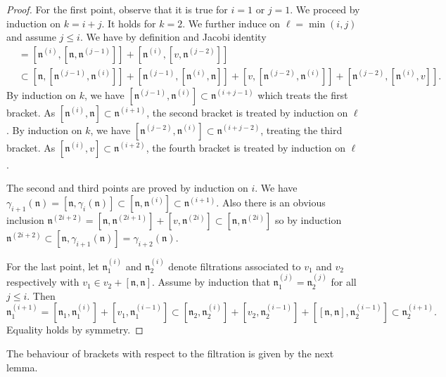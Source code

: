 \documentclass[11pt,leqno]{article}
\theoremstyle{plain}
\theoremstyle{definition}
\theoremstyle{remark}
\numberwithin{equation}{section}
\begin{document}
\begin{proof}
For the first point, observe that it is true for $i=1$ or $j=1$. We proceed by induction on $k=i+j$. It holds for $k=2$. We further induce on $\ell=\min(i,j)$ and assume $j \le i$. We have by definition and Jacobi identity
\begin{align*}
[\mathfrak{n}^{(i)},\mathfrak{n}^{(j)}] & = [\mathfrak{n}^{(i)},[\mathfrak{n},\mathfrak{n}^{(j-1)}]] + [\mathfrak{n}^{(i)},[v,\mathfrak{n}^{(j-2)}]] \\
& \subset [\mathfrak{n},[\mathfrak{n}^{(j-1)},\mathfrak{n}^{(i)}]]+[\mathfrak{n}^{(j-1)},[\mathfrak{n}^{(i)},\mathfrak{n}]]+[v,[\mathfrak{n}^{(j-2)},\mathfrak{n}^{(i)}]]+[\mathfrak{n}^{(j-2)},[\mathfrak{n}^{(i)},v]].
\end{align*}
By induction on $k$, we have $[\mathfrak{n}^{(j-1)},\mathfrak{n}^{(i)}]\subset  \mathfrak{n}^{(i+j-1)}$ which treats the first bracket. As $[\mathfrak{n}^{(i)},\mathfrak{n}]\subset \mathfrak{n}^{(i+1)}$, the second bracket is treated by induction on $\ell$. By induction on $k$, we have $[\mathfrak{n}^{(j-2)},\mathfrak{n}^{(i)}] \subset \mathfrak{n}^{(i+j-2)}$, treating the third bracket. As $[\mathfrak{n}^{(i)},v]\subset \mathfrak{n}^{(i+2)}$, the fourth bracket is treated by induction on $\ell$.

The second and third points are proved by induction on $i$. We have $\gamma_{i+1}(\mathfrak{n})=[\mathfrak{n},\gamma_i(\mathfrak{n})] \subset [\mathfrak{n},\mathfrak{n}^{(i)}] \subset \mathfrak{n}^{(i+1)}$. Also there is an obvious inclusion
$\mathfrak{n}^{(2i+2)}=[\mathfrak{n},\mathfrak{n}^{(2i+1)}]+[v,\mathfrak{n}^{(2i)}]\subset [\mathfrak{n},\mathfrak{n}^{(2i)}]$ so by induction $\mathfrak{n}^{(2i+2)} \subset [\mathfrak{n},\gamma_{i+1}(\mathfrak{n})]=\gamma_{i+2}(\mathfrak{n})$. 

For the last point, let $\mathfrak{n}_1^{(i)}$ and $\mathfrak{n}_2^{(i)}$ denote filtrations associated to $v_1$ and $v_2$ respectively with $v_1 \in v_2+[\mathfrak{n},\mathfrak{n}]$. Assume by induction that $\mathfrak{n}_1^{(j)}=\mathfrak{n}_2^{(j)}$ for all $j\le i$. Then
\[
\mathfrak{n}_1^{(i+1)}=[\mathfrak{n}_1,\mathfrak{n}_1^{(i)}]+[v_1,\mathfrak{n}_1^{(i-1)}] \subset [\mathfrak{n}_2,\mathfrak{n}_2^{(i)}]+[v_2,\mathfrak{n}_2^{(i-1)}]+[[\mathfrak{n},\mathfrak{n}],\mathfrak{n}_2^{(i-1)}]\subset \mathfrak{n}_2^{(i+1)}.
\]
Equality holds by symmetry.
\end{proof}

The behaviour of brackets with respect to the filtration is given by the next lemma.
\end{document}
